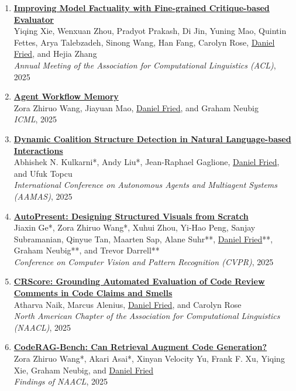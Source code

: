 \begin{enumerate}[leftmargin=-1mm,partopsep=0pt]
\item \href{https://arxiv.org/abs/2410.18359}{\textbf{Improving Model Factuality with Fine-grained Critique-based Evaluator}} \\
  Yiqing Xie, Wenxuan Zhou, Pradyot Prakash, Di Jin, Yuning Mao, Quintin Fettes, Arya Talebzadeh, Sinong Wang, Han Fang, Carolyn Rose, \underline{Daniel Fried}, and Hejia Zhang\\
  \emph{Annual Meeting of the Association for Computational Linguistics (ACL)}, 2025

\item \href{https://arxiv.org/abs/2409.07429}{\textbf{Agent Workflow Memory}} \\
  Zora Zhiruo Wang, Jiayuan Mao, \underline{Daniel Fried}, and Graham Neubig\\
  \emph{ICML}, 2025

\item \href{https://arxiv.org/abs/2502.16339}{\textbf{Dynamic Coalition Structure Detection in Natural Language-based Interactions}} \\
  Abhishek N. Kulkarni*, Andy Liu*, Jean-Raphael Gaglione, \underline{Daniel Fried}, and Ufuk Topcu\\
  \emph{International Conference on Autonomous Agents and Multiagent Systems (AAMAS)}, 2025

\item \href{https://arxiv.org/abs/2501.00912}{\textbf{AutoPresent: Designing Structured Visuals from Scratch}} \\
  Jiaxin Ge*, Zora Zhiruo Wang*, Xuhui Zhou, Yi-Hao Peng, Sanjay Subramanian, Qinyue Tan, Maarten Sap, Alane Suhr**, \underline{Daniel Fried}**, Graham Neubig**, and Trevor Darrell**\\
  \emph{Conference on Computer Vision and Pattern Recognition (CVPR)}, 2025

\item \href{https://arxiv.org/abs/2409.19801}{\textbf{CRScore: Grounding Automated Evaluation of Code Review Comments in Code Claims and Smells}} \\
  Atharva Naik, Marcus Alenius, \underline{Daniel Fried}, and Carolyn Rose\\
  \emph{North American Chapter of the Association for Computational Linguistics (NAACL)}, 2025

\item \href{https://arxiv.org/abs/2406.14497}{\textbf{{CodeRAG-Bench}: Can Retrieval Augment Code Generation?}} \\
  Zora Zhiruo Wang*, Akari Asai*, Xinyan Velocity Yu, Frank F. Xu, Yiqing Xie, Graham Neubig, and \underline{Daniel Fried}\\
  \emph{Findings of NAACL}, 2025


\end{enumerate}
